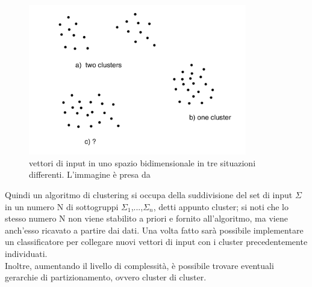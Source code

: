 \begin{figure}[h!]
	\centering
	\includegraphics[width=0.85\textwidth]{figs/Unsup_learning.png}
	\caption{vettori di input in uno spazio bidimensionale in tre situazioni differenti. L'immagine è presa da \cite{IntroML}}
	\label{Unsup}
\end{figure}

Quindi un algoritmo di clustering si occupa della suddivisione del set di input $\Sigma$ in un numero N di sottogruppi $\Sigma_1$,...,$\Sigma_n$, detti appunto cluster; si noti che lo stesso numero N non viene stabilito a priori e fornito all'algoritmo, ma viene anch'esso ricavato a partire dai dati. Una volta fatto sarà possibile implementare un classificatore per collegare nuovi vettori di input con i cluster precedentemente individuati.\\
Inoltre, aumentando il livello di complessità, è possibile trovare eventuali gerarchie di partizionamento, ovvero cluster di cluster.

\newpage

